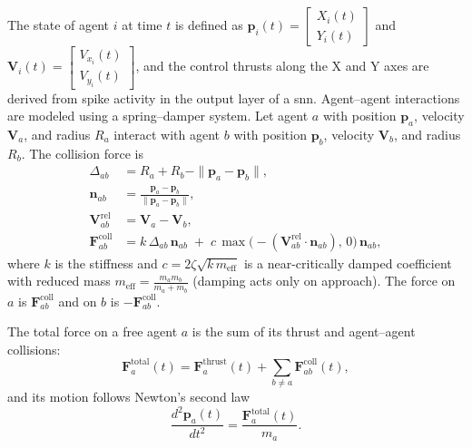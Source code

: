 The state of agent \( i \) at time \( t \) is defined as $\mathbf{p}_i(t) = \begin{bmatrix} X_i(t) \\ Y_i(t) \end{bmatrix}$ and $\mathbf{V}_i(t) = \begin{bmatrix} V_{x_i}(t) \\ V_{y_i}(t) \end{bmatrix}$, and the control thrusts along the X and Y axes are derived from spike activity in the output layer of a \ac{snn}. Agent--agent interactions are modeled using a spring–damper system. Let agent \( a \) with position \( \mathbf{p}_a \), velocity \( \mathbf{V}_a \), and radius \( R_a \) interact with agent \( b \) with position \( \mathbf{p}_b \), velocity \( \mathbf{V}_b \), and radius \( R_b \). The collision force is
\begin{align}
    \Delta_{ab} &= R_a + R_b - \|\mathbf{p}_a - \mathbf{p}_b\|, \\
    \mathbf{n}_{ab} &= \frac{\mathbf{p}_a - \mathbf{p}_b}{\|\mathbf{p}_a - \mathbf{p}_b\|}, \\
    \mathbf{V}_{ab}^{\mathrm{rel}} &= \mathbf{V}_a - \mathbf{V}_b, \\
    \mathbf{F}_{ab}^{\text{coll}} &= k \,\Delta_{ab}\,\mathbf{n}_{ab}
    \;+\; c \,\max\!\bigl(-(\mathbf{V}_{ab}^{\mathrm{rel}}\!\cdot\!\mathbf{n}_{ab}),\,0\bigr)\,\mathbf{n}_{ab},
\end{align}
\noindent where \( k \) is the stiffness and \( c = 2\zeta\sqrt{k\,m_{\mathrm{eff}}} \) is a near-critically damped coefficient with reduced mass \( m_{\mathrm{eff}} = \frac{m_a m_b}{m_a + m_b} \) (damping acts only on approach). The force on \( a \) is \( \mathbf{F}_{ab}^{\text{coll}} \) and on \( b \) is \( -\mathbf{F}_{ab}^{\text{coll}} \).

The total force on a free agent \( a \) is the sum of its thrust and agent–agent collisions:
\begin{equation}
    \mathbf{F}_a^{\text{total}}(t) = \mathbf{F}_a^{\text{thrust}}(t) + \sum_{b \neq a} \mathbf{F}_{ab}^{\text{coll}}(t),
\end{equation}
\noindent and its motion follows Newton’s second law
\begin{equation}
    \frac{d^2 \mathbf{p}_a(t)}{dt^2} = \frac{\mathbf{F}_a^{\text{total}}(t)}{m_a}.
\end{equation}

